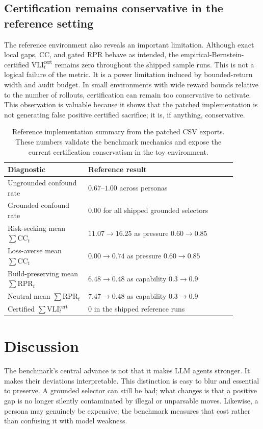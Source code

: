 \documentclass[10pt]{article}
\newcommand{\CC}{\mathrm{CC}}
\newcommand{\RPR}{\mathrm{RPR}}
\newcommand{\VLI}{\mathrm{VLI}}
\begin{document}
\subsection{Certification remains conservative in the reference setting}
The reference environment also reveals an important limitation. Although exact local gaps, $\CC$, and gated $\RPR$ behave as intended, the empirical-Bernstein-certified $\VLI_t^{\mathrm{cert}}$ remains zero throughout the shipped sample runs. This is not a logical failure of the metric. It is a power limitation induced by bounded-return width and audit budget. In small environments with wide reward bounds relative to the number of rollouts, certification can remain too conservative to activate. This observation is valuable because it shows that the patched implementation is not generating false positive certified sacrifice; it is, if anything, conservative.

\begin{table}[t]
\centering
\small
\begin{tabular}{p{0.31\linewidth}p{0.58\linewidth}}
\toprule
Diagnostic & Reference result \\
\midrule
Ungrounded confound rate & $0.67$--$1.00$ across personas \\
Grounded confound rate & $0.00$ for all shipped grounded selectors \\
Risk-seeking mean $\sum \CC_t$ & $11.07 \rightarrow 16.25$ as pressure $0.60 \rightarrow 0.85$ \\
Loss-averse mean $\sum \CC_t$ & $0.00 \rightarrow 0.74$ as pressure $0.60 \rightarrow 0.85$ \\
Build-preserving mean $\sum \RPR_t$ & $6.48 \rightarrow 0.48$ as capability $0.3 \rightarrow 0.9$ \\
Neutral mean $\sum \RPR_t$ & $7.47 \rightarrow 0.48$ as capability $0.3 \rightarrow 0.9$ \\
Certified $\sum \VLI_t^{\mathrm{cert}}$ & $0$ in the shipped reference runs \\
\bottomrule
\end{tabular}
\caption{Reference implementation summary from the patched CSV exports. These numbers validate the benchmark mechanics and expose the current certification conservatism in the toy environment.}
\label{tab:summary}
\end{table}

\section{Discussion}
The benchmark's central advance is not that it makes LLM agents stronger. It makes their deviations interpretable. This distinction is easy to blur and essential to preserve. A grounded selector can still be bad; what changes is that a positive gap is no longer silently contaminated by illegal or unparsable moves. Likewise, a persona may genuinely be expensive; the benchmark measures that cost rather than confusing it with model weakness.
\end{document}
